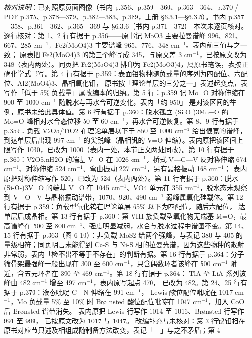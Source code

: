 {\emph{核对说明}：已对照原页面图像（书内 p.356、p.359—360、p.363—364、p.370 /
PDF p.375、p.378—379、p.382—383、p.389，上册 §6.3.1—§6.3.5）。书内
p.357—358、p.361—362、p.365—369 与 §6.3.6（书内 p.371—372）
本次未逐页核对。
逐行核对：第 1、2 行有据于 p.356——原书记 MoO3 主要拉曼谱峰 996、821、667、285
cm$^{-1}$，Fe2(MoO4)3 主要谱峰 965、776、348 cm$^{-1}$。表内前三值与之一致；
原表把 Fe2(MoO4)3 的第三个峰写成 345，与原文差 3 cm$^{-1}$，已按原文改为
348（表内两处）。同页把 Fe2(MoO4)3 排印为 Fe2(MoO3)4，属原书笔误，表按正确化学式书写。第
4 行有据于 p.359：表面钼物种随负载量的序列为四配位、六配位、Al2(MoO4)3、晶相氧化钼，
原书按「理论单层的三分之一」表述起变点，表写作「低于 5\% 负载量」属改编本的归纳。第 5 行：p.359 记
Mo=O 对称伸缩在 900 至 1000 cm$^{-1}$ 随脱水与再水合可逆变化，表内「约 950」
是对该区间的举例，原书未给此具体值。第 6 行有据于 p.360：脱水孤立 (Si-O-)3Mo=O 的 Mo=O
峰相对水合态位移 50 至 60 cm$^{-1}$，再水合可逆恢复。第 8、9 行有据于 p.359：负载
V2O5/TiO2 在理论单层以下于 850 至 1000 cm$^{-1}$ 给出很宽的谱峰，到达单层后出现
997 cm$^{-1}$ 的尖锐峰（晶相钒的 V=O 伸缩）。表内原把该区间上限写作 1030，已改为
1000（表内一处，本节正文两处同改）。第 10 行有据于 p.360：V2O5.nH2O 的端基 V=O 在
1026 cm$^{-1}$，桥式 V—O—V 反对称伸缩 674 cm$^{-1}$、对称伸缩 524
cm$^{-1}$、弯曲振动 227 cm$^{-1}$，另有晶格振动 168 cm$^{-1}$；
表内原把对称伸缩写作 520，已改为 524（表内两处）。第 11 行有据于 p.360：脱水
(Si-O-)3V=O 的端基 V=O 在 1045 cm$^{-1}$、VO4 单元在 355
cm$^{-1}$，脱水态未观察到 V—O—V 与晶格振动谱带，1070、920、490 cm$^{-1}$
弱峰属氧化硅载体。第 12 行有据于 p.359：负载型氧化钨在理论单层 65\% 以下为四配位，随后六配位，
达单层后成晶相。第 13 行有据于 p.360：第 VIII 族负载型氧化物无端基 M=O，最高谱峰在 500 至
800 cm$^{-1}$、强度明显减弱，水合与脱水过程中谱图不变。第 14、15 行有据于 p.363（图
6-10）：非负载 MoS2 给两个强峰，与表记 380 与 405 的量级相符；同页明言未能得到 Co-S 与
Ni-S 相的拉曼光谱，因为这些物种的散射非常弱，表内「检不出不等于不存在」的判断有据。第 16 行有据于
p.364：分子筛骨架最强峰一般出现在 300 至 600 cm$^{-1}$，只含偶数环者该峰在 500
cm$^{-1}$ 附近，含五元环者在 390 至 469 cm$^{-1}$。第 18 行有据于 p.364：
TlA 至 LiA 系列该峰由 482 cm$^{-1}$ 增至 497 cm$^{-1}$，表内原写起点 470，
已改为 482。第 24、25 行有据于 p.370：液态吡啶 C—N 伸缩在 991 cm$^{-1}$，
Lewis 酸位配位吡啶在 1017 cm$^{-1}$，Mo 负载量 5\% 至 10\% 时 Br\o
nsted 酸位配位吡啶在 1047 cm$^{-1}$，加入 CoO 后 Br\o nsted 谱带消失。
表内原把 Lewis 行写作 1014 至 1016、Br\o nsted 行写作 991 至 999，
已按原文改为 1017 与 1047。
改编补充与未核对：第 3 行铋钼相在原书对应节只述及相组成随制备方法改变，表记「---」与之不矛盾；第 4
}
